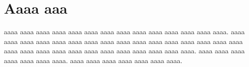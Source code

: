 \documentclass[12pt,openany,english]{book}        %
\begin{document}
%
%
%
\chapter{Aaaa aaa}\label{appenA}
%
%
%
\begin{doublespace}
%
aaaa aaaa aaaa aaaa aaaa aaaa aaaa 
aaaa aaaa aaaa aaaa aaaa aaaa aaaa. 
aaaa aaaa aaaa aaaa aaaa aaaa aaaa 
aaaa aaaa aaaa aaaa aaaa aaaa aaaa 
aaaa aaaa aaaa aaaa aaaa aaaa aaaa 
aaaa aaaa aaaa aaaa aaaa aaaa aaaa. 
aaaa aaaa aaaa aaaa aaaa aaaa aaaa. 
aaaa aaaa aaaa aaaa aaaa aaaa aaaa. 
%
\end{doublespace}
%
%
%
\end{document}
